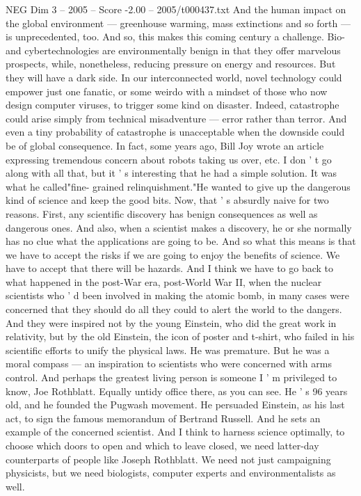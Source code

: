 \begin{textsample}{NEG Dim 3 – 2005 – Score -2.00 – 2005/t000437.txt}
And the human impact on the global environment — greenhouse warming, mass extinctions and so forth — is unprecedented, too.
And so, this makes this coming century a challenge.
Bio- and cybertechnologies are environmentally benign in that they offer marvelous prospects, while, nonetheless, reducing pressure on energy and resources.
But they will have a dark side.
In our interconnected world, novel technology could empower just one fanatic, or some weirdo with a mindset of those who now design computer viruses, to trigger some kind on disaster.
Indeed, catastrophe could arise simply from technical misadventure — error rather than terror.
And even a tiny probability of catastrophe is unacceptable when the downside could be of global consequence.
In fact, some years ago, Bill Joy wrote an article expressing tremendous concern about robots taking us over, etc.
I don ' t go along with all that, but it ' s interesting that he had a simple solution.
It was what he called"fine- grained relinquishment."He wanted to give up the dangerous kind of science and keep the good bits.
Now, that ' s absurdly naive for two reasons.
First, any scientific discovery has benign consequences as well as dangerous ones.
And also, when a scientist makes a discovery, he or she normally has no clue what the applications are going to be.
And so what this means is that we have to accept the risks if we are going to enjoy the benefits of science.
We have to accept that there will be hazards.
And I think we have to go back to what happened in the post-War era, post-World War II, when the nuclear scientists who ' d been involved in making the atomic bomb, in many cases were concerned that they should do all they could to alert the world to the dangers.
And they were inspired not by the young Einstein, who did the great work in relativity, but by the old Einstein, the icon of poster and t-shirt, who failed in his scientific efforts to unify the physical laws.
He was premature.
But he was a moral compass — an inspiration to scientists who were concerned with arms control.
And perhaps the greatest living person is someone I ' m privileged to know, Joe Rothblatt.
Equally untidy office there, as you can see.
He ' s 96 years old, and he founded the Pugwash movement.
He persuaded Einstein, as his last act, to sign the famous memorandum of Bertrand Russell.
And he sets an example of the concerned scientist.
And I think to harness science optimally, to choose which doors to open and which to leave closed, we need latter-day counterparts of people like Joseph Rothblatt.
We need not just campaigning physicists, but we need biologists, computer experts and environmentalists as well.

\end{textsample}
